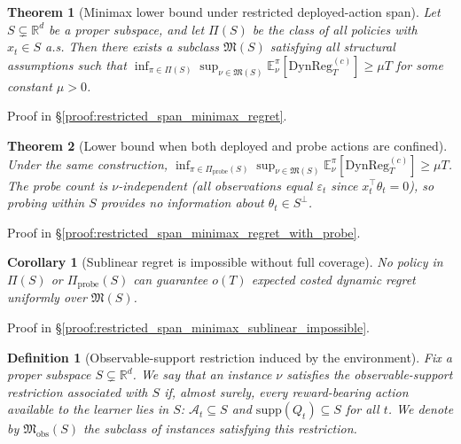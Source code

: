 \documentclass{article}
\newcommand{\R}{\mathbb{R}}
\newcommand{\E}{\mathbb{E}}
\newcommand{\cA}{\mathcal{A}}
\newcommand{\DynReg}{\mathrm{DynReg}}
\newcommand{\supp}{\mathrm{supp}}
\newtheorem{definition}{Definition}
\newtheorem{theorem}{Theorem}
\newtheorem{corollary}{Corollary}
\begin{document}
\begin{theorem}[Minimax lower bound under restricted deployed-action span]
\label{thm:restricted_span_minimax_regret}
Let $S \subsetneq \R^d$ be a proper subspace, and let $\Pi(S)$ be the class of all policies with $x_t \in S$ a.s.
Then there exists a subclass $\mathfrak M(S)$ satisfying all structural assumptions such that
$\inf_{\pi \in \Pi(S)} \sup_{\nu \in \mathfrak M(S)} \E_\nu^\pi[\DynReg_T^{(c)}] \ge \mu T$
for some constant $\mu > 0$.
\end{theorem}

Proof in \S\ref{proof:restricted_span_minimax_regret}.

\begin{theorem}[Lower bound when both deployed and probe actions are confined]
\label{thm:restricted_span_minimax_regret_with_probe}
Under the same construction, $\inf_{\pi \in \Pi_{\mathrm{probe}}(S)} \sup_{\nu \in \mathfrak M(S)} \E_\nu^\pi[\DynReg_T^{(c)}] \ge \mu T$.
The probe count is $\nu$-independent (all observations equal $\varepsilon_t$ since $x_t^\top \theta_t = 0$), so probing within $S$ provides no information about $\theta_t \in S^\perp$.
\end{theorem}

Proof in \S\ref{proof:restricted_span_minimax_regret_with_probe}.

\begin{corollary}[Sublinear regret is impossible without full coverage]
\label{cor:restricted_span_minimax_sublinear_impossible}
No policy in $\Pi(S)$ or $\Pi_{\mathrm{probe}}(S)$ can guarantee $o(T)$ expected costed dynamic regret uniformly over $\mathfrak M(S)$.
\end{corollary}

Proof in \S\ref{proof:restricted_span_minimax_sublinear_impossible}.

\begin{definition}[Observable-support restriction induced by the environment]
\label{def:observable_support_restriction}
Fix a proper subspace $S\subsetneq \R^d$. We say that an instance $\nu$ satisfies the observable-support restriction associated with $S$ if, almost surely, every reward-bearing action available to the learner lies in $S$: $\cA_t \subseteq S$ and $\supp(Q_t)\subseteq S$ for all $t$. We denote by $\mathfrak M_{\mathrm{obs}}(S)$ the subclass of instances satisfying this restriction.
\end{definition}
\end{document}

